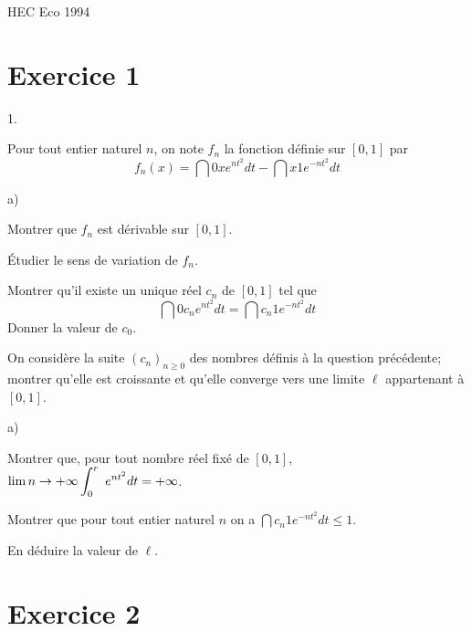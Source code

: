 \documentclass[11pt]{article}%
\begin{document}
\begin{center}
{\huge HEC Eco 1994}
\end{center}

\section*{Exercice 1}

\begin{noliste}{1.}
 \setlength{\itemsep}{4mm}
\item Pour tout entier naturel $n$, on note $f_{n}$ la fonction définie
sur $[0,1]$ par 
\[
f_{n}(x) = \dint{0}{x}e^{nt^{2}}dt-\dint{x}{1}e^{-nt^{2}}dt
\]

\begin{noliste}{a)}
 \setlength{\itemsep}{2mm}
\item Montrer que $f_{n}$ est dérivable sur $[0,1]$.

\item Étudier le sens de variation de $f_{n}$.
\end{noliste}

\item Montrer qu'il existe un unique réel $c_{n}$ de $[0,1]$ tel que 
\[
\dint{0}{c_{n}}e^{nt^{2}}dt = \dint{c_{n}}{1}e^{-nt^{2}}dt
\]
Donner la valeur de $c_{0}$.

\item On considère la suite $(c_{n})_{n\geq 0}$ des nombres définis à
la question précédente; montrer qu'elle est croissante et qu'elle
converge
vers une limite $\ell $ appartenant à $[0,1]$.

\item 

\begin{noliste}{a)}
 \setlength{\itemsep}{2mm}
\item Montrer que, pour tout nombre réel fixé de $[0,1]$,
$\lim{n\rightarrow + \infty }\displaystyle \int_{0}^{r}\ e^{nt^{2}}dt = + \infty $.

\item Montrer que pour tout entier naturel $n$ on a
$\dint{c_{n}}{1}e^{-nt^{2}}dt\leq 1$.

\item En déduire la valeur de $\ell $.
\end{noliste}
\end{noliste}

\section*{Exercice 2}
\end{document}
